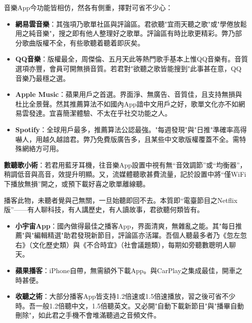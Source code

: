 


音樂App今功能皆相仿，然各有側重，擇對可省不少心：

\begin{itemize}
  \item \textbf{網易雲音樂}：其強項乃歌單社區與評論區。君欲聽"宜雨天聽之歌"或"學倦放鬆用之純音樂"，搜之即有他人整理好之歌單。評論區有時比歌更精彩。弊乃部分歌曲版權不全，有些歌聽着聽着即灰矣。
  \item \textbf{QQ音樂}：版權最全，周傑倫、五月天此等熱門歌手基本上惟QQ音樂有。音質選項亦豐，會員可開無損音質。若君對"欲聽之歌皆能搜到"此事甚在意，QQ音樂乃最穩之選。
  \item \textbf{Apple Music}：蘋果用戶之首選。界面淨、無廣告、音質佳，且支持無損與杜比全景聲。然其推薦算法不如國內App諳中文用戶之好，歌單文化亦不如網易雲發達。宜喜簡潔體驗、不太在乎社交功能之人。
  \item \textbf{Spotify}：全球用戶最多，推薦算法公認最強。"每週發現"與"日推"準確率高得嚇人，用越久越諳君。弊乃免費版廣告多，且某些中文歌版權覆蓋不全。需特殊網絡方可用。
\end{itemize}

\textbf{數聽歌小術}：若君用藍牙耳機，往音樂App設置中視有無“音效調節”或“均衡器”，稍調低音與高音，效提升明顯。又，流媒體聽歌甚費流量，記於設置中將“僅WiFi下播放無損”開之，或預下載好喜之歌單離線聽。


播客此物，未聽者覺與己無關，一旦始聽即回不去。本質即“電臺節目之Netflix版”——有人聊科技，有人講歷史，有人讀故事，君欲聽何類皆有。

\begin{itemize}
  \item \textbf{小宇宙App}：國內做得最佳之播客App，界面清爽，無雜亂之能。其"每日推薦"與"編輯精選"助君發現新節目，評論區亦活躍。吾個人聽最多者乃《忽左忽右》（文化歷史類）與《不合時宜》（社會議題類），每期如旁聽數聰明人聊天。
  \item \textbf{蘋果播客}：iPhone自帶，無需額外下載App。與CarPlay之集成最佳，開車之時甚便。
  \item \textbf{收聽之術}：大部分播客App皆支持1.2倍速或1.5倍速播放，習之後可省不少時。吾一般1.2倍聽中文，1.5倍聽英文。又必開"自動下載新節目"與"播畢自動刪除"，如此君之手機不會堆滿聽過之音頻文件。
\end{itemize}

